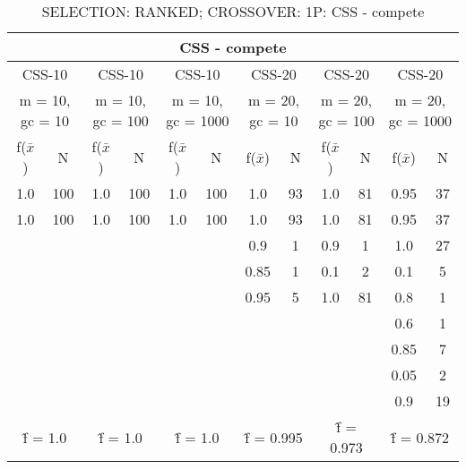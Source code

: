 \begin{table}[H]
	\centering
	\caption{SELECTION: RANKED; CROSSOVER: 1P: CSS - compete}
	\begin{adjustbox}{width=1\textwidth}
		\begin{tabular}{ |c|c||c|c||c|c||c|c||c|c||c|c| }
			\hline
			\multicolumn{12}{|c|}{CSS - compete} \\
			\hline
			\multicolumn{2}{|c||}{CSS-10} & \multicolumn{2}{c||}{CSS-10} & \multicolumn{2}{c||}{CSS-10} & \multicolumn{2}{c||}{CSS-20} & \multicolumn{2}{c||}{CSS-20} & \multicolumn{2}{c|}{CSS-20}\\
			\hline
			\multicolumn{2}{|c||}{m = 10, gc = 10} & \multicolumn{2}{c||}{m = 10, gc = 100} & \multicolumn{2}{c||}{m = 10, gc = 1000} & \multicolumn{2}{c||}{m = 20, gc = 10} & \multicolumn{2}{c||}{m = 20, gc = 100} & \multicolumn{2}{c|}{m = 20, gc = 1000}\\
			\hline
			f($\bar{x}$) & N & f($\bar{x}$) & N & f($\bar{x}$) & N & f($\bar{x}$) & N & f($\bar{x}$) & N & f($\bar{x}$) & N\\
			\hline
			\hline
			1.0 & 100 & 1.0 & 100 & 1.0 & 100 & 1.0 & 93 & 1.0 & 81 & 0.95 & 37\\
			\hline
			1.0 & 100 & 1.0 & 100 & 1.0 & 100 & 1.0 & 93 & 1.0 & 81 & 0.95 & 37\\
			&   &   &   &   &   & 0.9 & 1 & 0.9 & 1 & 1.0 & 27\\
			&   &   &   &   &   & 0.85 & 1 & 0.1 & 2 & 0.1 & 5\\
			&   &   &   &   &   & 0.95 & 5 & 1.0 & 81 & 0.8 & 1\\
			&   &   &   &   &   &   &   &   &   & 0.6 & 1\\
			&   &   &   &   &   &   &   &   &   & 0.85 & 7\\
			&   &   &   &   &   &   &   &   &   & 0.05 & 2\\
			&   &   &   &   &   &   &   &   &   & 0.9 & 19\\
			\hline
			\multicolumn{2}{|c||}{\^{f} = 1.0} & \multicolumn{2}{c||}{\^{f} = 1.0} & \multicolumn{2}{c||}{\^{f} = 1.0} & \multicolumn{2}{c||}{\^{f} = 0.995} & \multicolumn{2}{c||}{\^{f} = 0.973} & \multicolumn{2}{c|}{\^{f} = 0.872}\\
			\hline
		\end{tabular}
	\end{adjustbox}
\end{table}

